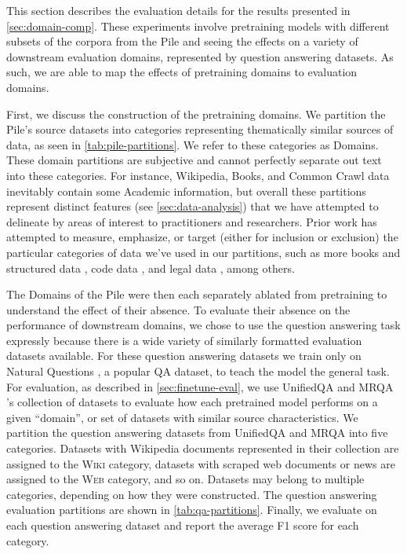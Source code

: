\documentclass{article}
\begin{document}
This section describes the evaluation details for the results presented in \cref{sec:domain-comp}.
These experiments involve pretraining models with different subsets of the corpora from the Pile \citep{gao2020pile} and seeing the effects on a variety of downstream evaluation domains, represented by question answering datasets.
As such, we are able to map the effects of pretraining domains to evaluation domains.

First, we discuss the construction of the pretraining domains.
We partition the Pile's source datasets into categories representing thematically similar sources of data, as seen in \cref{tab:pile-partitions}.
We refer to these categories as Domains.
These domain partitions are subjective and cannot perfectly separate out text into these categories. 
For instance, Wikipedia, Books, and Common Crawl data inevitably contain some Academic information, but overall these partitions represent distinct features (see \cref{sec:data-analysis}) that we have attempted to delineate by areas of interest to practitioners and researchers.
Prior work has attempted to measure, emphasize, or target (either for inclusion or exclusion) the particular categories of data we've used in our partitions, such as more books and structured data \citep{brown2020language, chowdhery2022palm}, code data \citep{chen2021evaluating}, and legal data \citep{dodge2021documenting}, among others.



The Domains of the Pile were then each separately ablated from pretraining to understand the effect of their absence.
To evaluate their absence on the performance of downstream domains, we chose to use the question answering task expressly because there is a wide variety of similarly formatted evaluation datasets available.
For these question answering datasets we train only on Natural Questions \citep{kwiatkowski2019natural}, a popular QA dataset, to teach the model the general task.
For evaluation, as described in \cref{sec:finetune-eval}, we use UnifiedQA \citep{khashabi-etal-2020-unifiedqa} and MRQA \citep{fisch2019mrqa}'s collection of datasets to evaluate how each pretrained model performs on a given ``domain'', or set of datasets with similar source characteristics.
We partition the question answering datasets from UnifiedQA and MRQA into five categories.
Datasets with Wikipedia documents represented in their collection are assigned to the \textsc{Wiki} category, datasets with scraped web documents or news are assigned to the \textsc{Web} category, and so on.
Datasets may belong to multiple categories, depending on how they were constructed.
The question answering evaluation partitions are shown in \cref{tab:qa-partitions}.
Finally, we evaluate on each question answering dataset and report the average F1 score for each category.
\end{document}
